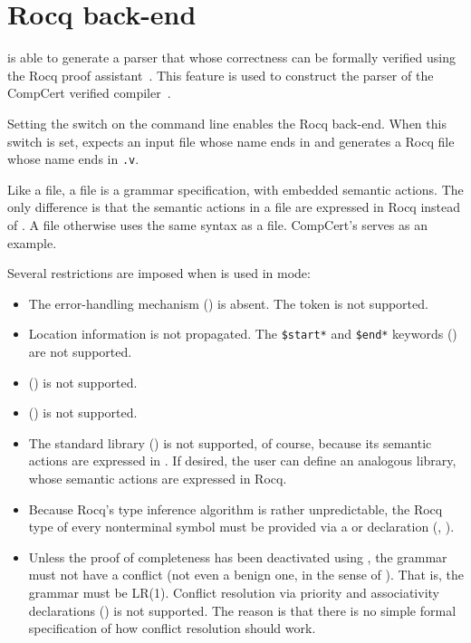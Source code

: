 \documentclass[onecolumn,11pt,nocopyrightspace,preprint]{sigplanconf}
\begin{document}

\section{Rocq back-end}
\label{sec:rocq}

\menhir is able to generate a parser that whose correctness can be formally
verified using the Rocq proof assistant~\cite{jourdan-leroy-pottier-12}. This
feature is used to construct the parser of the CompCert verified
compiler~\cite{compcert}.

Setting the \orocq switch on the command line enables the Rocq back-end.  When
this switch is set, \menhir expects an input file whose name ends
in \vy and generates a Rocq file whose name ends
in \texttt{.v}.

Like a \mly file, a \vy file is a grammar specification,
with embedded semantic actions. The only difference is that the semantic
actions in a \vy file are expressed in Rocq instead
of \ocaml. A \vy file otherwise uses the same syntax as
a \mly file. CompCert's
serves as an example.

Several restrictions are imposed when \menhir is used in \orocq mode:
%
\begin{itemize}
\item The error-handling mechanism () is absent.
      The \error token is not supported.
\item Location information is not propagated. The \verb+$start*+ and \verb+$end*+
      keywords () are not supported.
\item \dparameter () is not supported.
\item \dinline () is not supported.
\item The standard library () is not supported, of course,
      because its semantic actions are expressed in \ocaml. If desired, the user can define
      an analogous library, whose semantic actions are expressed in Rocq.
\item Because Rocq's type inference algorithm is rather unpredictable,
      the Rocq type of every nonterminal symbol must be provided via a
      \dtype or \dstart declaration (, ).
\item Unless the proof of completeness has been deactivated using
  \orocqnocomplete, the grammar must not have a conflict
  (not even a benign one, in the sense of ).
  That is, the grammar must be LR(1). Conflict resolution via
  priority and associativity declarations ()
  is not supported.
  The reason is that there is no simple formal specification
  of how conflict resolution should work.
\end{itemize}
\end{document}
